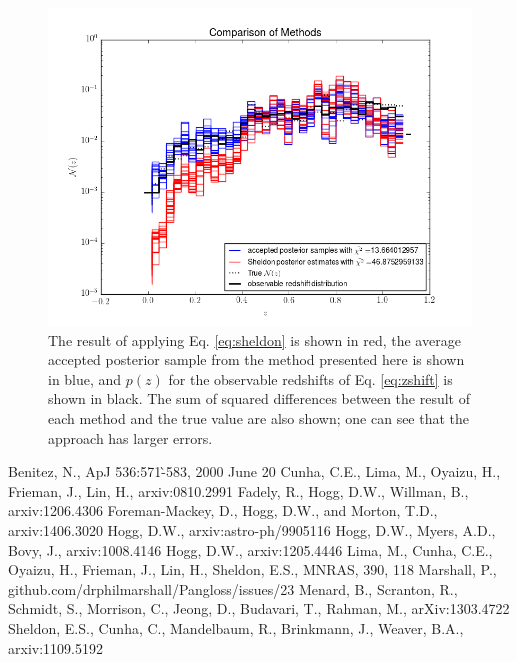 \documentclass[12pt, onecolumn]{emulateapj}
\begin{document}
\begin{figure}
\label{fig:sheldon}
\includegraphics[scale=0.5]{compare-sheldon.png}
\caption{The result of applying Eq. \ref{eq:sheldon} is shown in red, the average accepted posterior sample from the method presented here is shown in blue, and $p(z)$ for the observable redshifts of Eq. \ref{eq:zshift} is shown in black.  The sum of squared differences between the result of each method and the true value are also shown; one can see that the \citet{she11} approach has larger errors.}
\end{figure}



\begin{thebibliography}{}
Benitez, N., ApJ 536:571-̀583, 2000 June 20
Cunha, C.E., Lima, M., Oyaizu, H., Frieman, J., Lin, H., arxiv:0810.2991
Fadely, R., Hogg, D.W., Willman, B., arxiv:1206.4306
Foreman-Mackey, D., Hogg, D.W., and Morton, T.D., arxiv:1406.3020
Hogg, D.W., arxiv:astro-ph/9905116
Hogg, D.W., Myers, A.D., Bovy, J., arxiv:1008.4146
Hogg, D.W., arxiv:1205.4446
Lima, M., Cunha, C.E., Oyaizu, H., Frieman, J., Lin, H., Sheldon, E.S., MNRAS, 390, 118
Marshall, P., github.com/drphilmarshall/Pangloss/issues/23
Menard, B., Scranton, R., Schmidt, S., Morrison, C., Jeong, D., Budavari, T., Rahman, M., arXiv:1303.4722 
Sheldon, E.S., Cunha, C., Mandelbaum, R., Brinkmann, J., Weaver, B.A., arxiv:1109.5192

\end{thebibliography}
\end{document}
